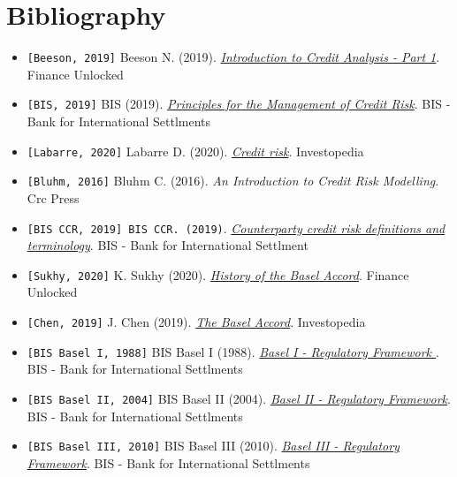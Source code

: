\documentclass[a4paper,12pt]{article}
\begin{document}
    \pagebreak

    \section*{Bibliography}

    \begin{itemize}
        \item \texttt{[Beeson, 2019]} Beeson N. (2019). \textit{\href{https://financeunlocked.com/credit-analysis-part-i/}{Introduction to Credit Analysis - Part 1}}. Finance Unlocked
        \item \texttt{[BIS, 2019]} BIS (2019). \textit{\href{https://www.bis.org/publ/bcbs75.htm}{Principles for the Management of Credit Risk}}. BIS - Bank for International Settlments 
        \item \texttt{[Labarre, 2020]} Labarre D. (2020). \textit{\href{https://www.investopedia.com/terms/c/creditrisk.asp}{Credit risk}}. Investopedia     
        \item \texttt{[Bluhm, 2016]} Bluhm C. (2016). \textit{An Introduction to Credit Risk Modelling}. Crc Press
        \item \texttt{[BIS CCR, 2019] BIS CCR. (2019)}. \textit{\href{https://www.bis.org/basel_framework/chapter/CRE/50.htm?inforce=20191215}{Counterparty credit risk definitions and terminology}}.  BIS - Bank for International Settlment
        \item \texttt{[Sukhy, 2020]} K. Sukhy (2020). \textit{\href{https://financeunlocked.com/history\-of\-the\-basel\-accord/}{History of the Basel Accord}}. Finance Unlocked
        \item \texttt{[Chen, 2019]} J. Chen (2019). \textit{\href{https://www.investopedia.com/terms/b/basel_accord.asp)}{The Basel Accord}}. Investopedia
        \item \texttt{[BIS Basel I, 1988]}  BIS Basel I (1988). \textit{\href{https://www.bis.org/publ/bcbs04.pdf}{Basel I - Regulatory Framework }}. BIS - Bank for International Settlments   
        \item \texttt{[BIS Basel II, 2004]}  BIS Basel II (2004). \textit{\href{https://www.bis.org/publ/bcbsca02.htm}{Basel II - Regulatory Framework}}. BIS - Bank for International Settlments
        \item \texttt{[BIS Basel III, 2010]}  BIS Basel III (2010). \textit{\href{https://www.bis.org/bcbs/basel3.htm}{Basel III - Regulatory Framework}}. BIS - Bank for International Settlments

\end{itemize}
\end{document}
